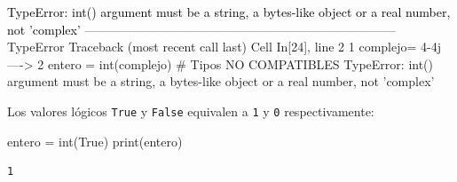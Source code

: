 \documentclass[
  spanish,
  letterpaper,
]{scrbook}
\newenvironment{Shaded}{\begin{snugshade}}{\end{snugshade}}
\newcommand{\BuiltInTok}[1]{\textcolor[rgb]{0.00,0.23,0.31}{#1}}
\newcommand{\NormalTok}[1]{\textcolor[rgb]{0.00,0.23,0.31}{#1}}
\newcommand{\OperatorTok}[1]{\textcolor[rgb]{0.37,0.37,0.37}{#1}}
\newcommand{\VariableTok}[1]{\textcolor[rgb]{0.07,0.07,0.07}{#1}}
\theoremstyle{definition}
\theoremstyle{remark}
\begin{document}
\begin{Highlighting}
\textcolor{black}{TypeError: int() argument must be a string, a bytes-like object or a real number, not 'complex'}
\textcolor{black}{}\textcolor{QuartoInternalColor1}{---------------------------------------------------------------------------}\textcolor{QuartoInternalColor2}{}
\textcolor{QuartoInternalColor2}{}\textcolor{QuartoInternalColor1}{TypeError}\textcolor{QuartoInternalColor2}{                                 Traceback (most recent call last)}
\textcolor{QuartoInternalColor2}{}\textcolor{QuartoInternalColor3}{Cell}\textcolor{QuartoInternalColor2}{}\textcolor{QuartoInternalColor3}{ }\textcolor{QuartoInternalColor2}{}\textcolor{QuartoInternalColor4}{In[24]}\textcolor{QuartoInternalColor2}{}\textcolor{QuartoInternalColor4}{, line 2}\textcolor{QuartoInternalColor2}{}
\textcolor{QuartoInternalColor2}{}\textcolor{QuartoInternalColor4}{      1}\textcolor{QuartoInternalColor2}{ complejo= }\textcolor{QuartoInternalColor4}{4}\textcolor{QuartoInternalColor2}{-}\textcolor{QuartoInternalColor4}{4}\textcolor{QuartoInternalColor2}{j}
\textcolor{QuartoInternalColor2}{}\textcolor{QuartoInternalColor4}{----> }\textcolor{QuartoInternalColor2}{}\textcolor{QuartoInternalColor4}{2}\textcolor{QuartoInternalColor2}{ entero = }\textcolor{QuartoInternalColor5}{int}\textcolor{QuartoInternalColor2}{}\textcolor{QuartoInternalColor2}{(}\textcolor{QuartoInternalColor2}{}\textcolor{QuartoInternalColor2}{complejo}\textcolor{QuartoInternalColor2}{}\textcolor{QuartoInternalColor2}{)}\textcolor{QuartoInternalColor2}{ }\textcolor{QuartoInternalColor9}{# Tipos NO COMPATIBLES}\textcolor{QuartoInternalColor2}{}
\textcolor{QuartoInternalColor2}{}\textcolor{QuartoInternalColor1}{TypeError}\textcolor{QuartoInternalColor2}{: int() argument must be a string, a bytes-like object or a real number, not 'complex'}
\end{Highlighting}

Los valores lógicos \texttt{True} y \texttt{False} equivalen a
\texttt{1} y \texttt{0} respectivamente:

\begin{Shaded}
\begin{Highlighting}[]
\NormalTok{entero }\OperatorTok{=} \BuiltInTok{int}\NormalTok{(}\VariableTok{True}\NormalTok{) }
\BuiltInTok{print}\NormalTok{(entero)}
\end{Highlighting}
\end{Shaded}

\begin{verbatim}
1
\end{verbatim}
\end{document}
